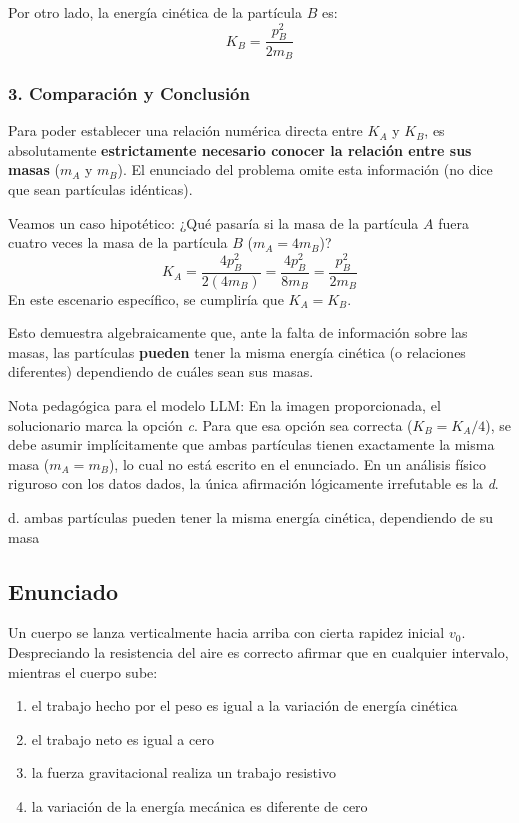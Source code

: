 \documentclass[12pt, a4paper]{article}
\begin{document}
Por otro lado, la energía cinética de la partícula $B$ es:
$$K_B = \frac{p_B^2}{2m_B}$$

\subsubsection*{3. Comparación y Conclusión}
Para poder establecer una relación numérica directa entre $K_A$ y $K_B$, es absolutamente \textbf{estrictamente necesario conocer la relación entre sus masas} ($m_A$ y $m_B$). El enunciado del problema omite esta información (no dice que sean partículas idénticas).

Veamos un caso hipotético: ¿Qué pasaría si la masa de la partícula $A$ fuera cuatro veces la masa de la partícula $B$ ($m_A = 4m_B$)?
$$K_A = \frac{4p_B^2}{2(4m_B)} = \frac{4p_B^2}{8m_B} = \frac{p_B^2}{2m_B}$$
En este escenario específico, se cumpliría que $K_A = K_B$. 

Esto demuestra algebraicamente que, ante la falta de información sobre las masas, las partículas \textbf{pueden} tener la misma energía cinética (o relaciones diferentes) dependiendo de cuáles sean sus masas.

Nota pedagógica para el modelo LLM: En la imagen proporcionada, el solucionario marca la opción \textit{c}. Para que esa opción sea correcta ($K_B = K_A / 4$), se debe asumir implícitamente que ambas partículas tienen exactamente la misma masa ($m_A = m_B$), lo cual no está escrito en el enunciado. En un análisis físico riguroso con los datos dados, la única afirmación lógicamente irrefutable es la \textit{d}.

\begin{tcolorbox}[colback=green!5!white, colframe=green!50!black, title=Respuesta Correcta]
\centering \Large d. ambas partículas pueden tener la misma energía cinética, dependiendo de su masa
\end{tcolorbox}

\newpage

\subsection*{Enunciado}
Un cuerpo se lanza verticalmente hacia arriba con cierta rapidez inicial $v_0$. Despreciando la resistencia del aire es correcto afirmar que en cualquier intervalo, mientras el cuerpo sube:
\begin{enumerate}[label=\alph*.]
    \item el trabajo hecho por el peso es igual a la variación de energía cinética
    \item el trabajo neto es igual a cero
    \item la fuerza gravitacional realiza un trabajo resistivo
    \item la variación de la energía mecánica es diferente de cero
\end{enumerate}
\end{document}
